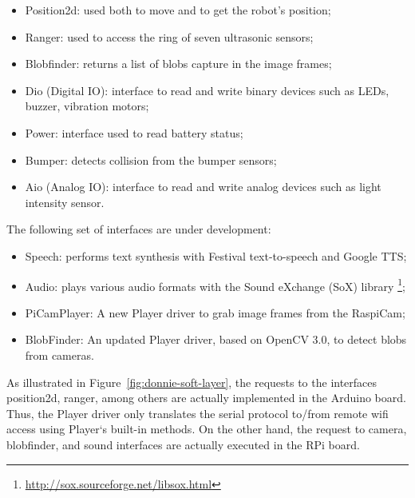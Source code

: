 \begin{itemize}
\item Position2d: used both to move and to get the robot's position;
\item Ranger: used to access the ring of seven ultrasonic sensors;
\item Blobfinder: returns a list of blobs capture in the image frames;
\item Dio (Digital IO): interface to read and write binary devices such as LEDs, buzzer, vibration motors;
\item Power: interface used to read battery status;
\item Bumper: detects collision from the bumper sensors;
\item Aio (Analog IO): interface to read and write analog devices such as light intensity sensor.
\end{itemize}

The following set of interfaces are under development:

\begin{itemize}
\item Speech: performs text synthesis with Festival text-to-speech \cite{black2001} and Google TTS;
\item Audio: plays various audio formats with the Sound eXchange (SoX) library \footnote{\url{http://sox.sourceforge.net/libsox.html}};
\item PiCamPlayer: A new Player driver to grab image frames from the RaspiCam;
\item BlobFinder: An updated Player driver, based on OpenCV 3.0, to detect blobs from cameras.
\end{itemize}


As illustrated in Figure~\ref{fig:donnie-soft-layer}, the requests to the interfaces position2d, ranger, among others are actually implemented in the Arduino board. Thus, the Player driver only translates the serial protocol to/from remote wifi access using Player`s built-in methods. On the other hand, the request to camera, blobfinder, and sound interfaces are actually executed in the RPi board. 

